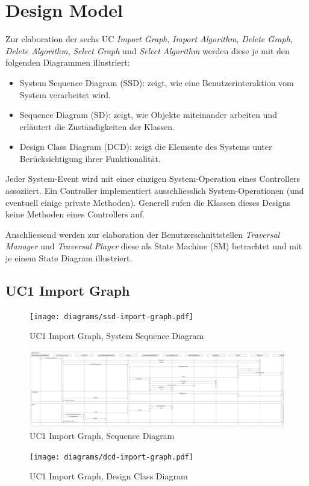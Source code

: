 \section{Design Model}
\label{sec:Design Model}
Zur elaboration der sechs UC \textit{Import Graph}, \textit{Import Algorithm}, \textit{Delete Graph}, \textit{Delete Algorithm}, \textit{Select Graph} und \textit{Select Algorithm} werden diese je mit den folgenden Diagrammen illustriert:
\begin{itemize}
  \item System Sequence Diagram (SSD): zeigt, wie eine Benutzerinteraktion vom System verarbeitet wird.
  \item Sequence Diagram (SD): zeigt, wie Objekte miteinander arbeiten und erl\"autert die Zust\"andigkeiten der Klassen. 
  \item Design Class Diagram (DCD): zeigt die Elemente des Systems unter Ber\"ucksichtigung ihrer Funktionalit\"at.
\end{itemize}
Jeder System-Event wird mit einer einzigen System-Operation eines Controllers assoziiert. Ein Controller implementiert ausschliesslich System-Operationen (und eventuell einige private Methoden). Generell rufen die Klassen dieses Designs keine Methoden eines Controllers auf.

Anschliessend werden zur elaboration der Benutzerschnittstellen \textit{Traversal Manager} und \textit{Traversal Player} diese als State Machine (SM) betrachtet und mit je einem State Diagram illustriert.
% 
\subsection{UC1 Import Graph}
\begin{figure}[H]
    \centering
    \texttt{[image: diagrams/ssd-import-graph.pdf]}
    \caption{UC1 Import Graph, System Sequence Diagram}
    \label{fig:import-graph-ssd}
\end{figure}
\begin{figure}[H]
    \centering
    \includegraphics[width=\textwidth]{diagrams/sd-import-graph.pdf}
    \caption{UC1 Import Graph, Sequence Diagram}
    \label{fig:import-graph-sd}
\end{figure}
\begin{figure}[H]
    \centering
    \texttt{[image: diagrams/dcd-import-graph.pdf]}
    \caption{UC1 Import Graph, Design Class Diagram}
    \label{fig:import-graph-dcd}
\end{figure}
% 
